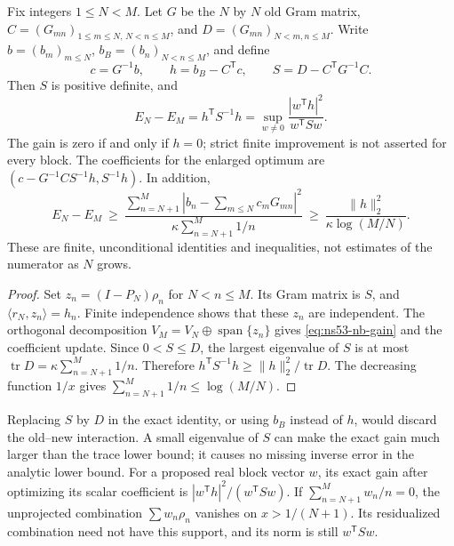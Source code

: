\begin{proposition}
\label{prop:ns53-nb-block-gain}
Fix integers $1\leq N<M$. Let $G$ be the $N$ by $N$ old Gram matrix,
$C=(G_{mn})_{1\leq m\leq N,\,N<n\leq M}$, and
$D=(G_{mn})_{N<m,n\leq M}$.
Write $b=(b_m)_{m\leq N}$, $b_B=(b_n)_{N<n\leq M}$, and define
\begin{equation}
 c=G^{-1}b,\qquad h=b_B-C^{\mathsf T}c,\qquad
 S=D-C^{\mathsf T}G^{-1}C.
 \label{eq:ns53-nb-schur}
\end{equation}
Then $S$ is positive definite, and
\begin{equation}
 E_N-E_M=h^{\mathsf T}S^{-1}h
 =\sup_{w\ne0}\frac{|w^{\mathsf T}h|^2}{w^{\mathsf T}Sw}.
 \label{eq:ns53-nb-gain}
\end{equation}
The gain is zero if and only if $h=0$; strict finite improvement is not
asserted for every block. The coefficients for the enlarged optimum are
$(c-G^{-1}CS^{-1}h,S^{-1}h)$. In addition,
\begin{equation}
 E_N-E_M\ \geq\
 \frac{\sum_{n=N+1}^M|b_n-\sum_{m\leq N}c_mG_{mn}|^2}
 {\kappa\sum_{n=N+1}^M1/n}
 \ \geq\
 \frac{\|h\|_2^2}{\kappa\log(M/N)}.
 \label{eq:ns53-nb-trace-gain}
\end{equation}
These are finite, unconditional identities and inequalities, not estimates
of the numerator as $N$ grows.
\end{proposition}

\begin{proof}
Set $z_n=(I-P_N)\rho_n$ for $N<n\leq M$. Its Gram matrix is $S$,
and $\langle r_N,z_n\rangle=h_n$. Finite independence shows that these
$z_n$ are independent. The orthogonal decomposition
$V_M=V_N\mathbin{\oplus}\operatorname{span}\{z_n\}$ gives
\eqref{eq:ns53-nb-gain} and the coefficient update. Since
$0<S\leq D$, the largest eigenvalue of $S$ is at most
$\operatorname{tr}D=\kappa\sum_{n=N+1}^M1/n$. Therefore
$h^{\mathsf T}S^{-1}h\geq\|h\|_2^2/\operatorname{tr}D$.
The decreasing function $1/x$ gives
$\sum_{n=N+1}^M1/n\leq\log(M/N)$.
\end{proof}

\begin{remark}
Replacing $S$ by $D$ in the exact identity, or using $b_B$ instead of $h$,
would discard the old--new interaction. A small eigenvalue of $S$ can
make the exact gain much larger than the trace lower bound; it causes no
missing inverse error in the analytic lower bound. For a proposed real
block vector $w$, its exact gain after optimizing its scalar coefficient
is $|w^{\mathsf T}h|^2/(w^{\mathsf T}Sw)$. If
$\sum_{n=N+1}^M w_n/n=0$, the unprojected combination
$\sum w_n\rho_n$ vanishes on $x>1/(N+1)$. Its residualized combination
need not have this support, and its norm is still $w^{\mathsf T}Sw$.
\end{remark}

